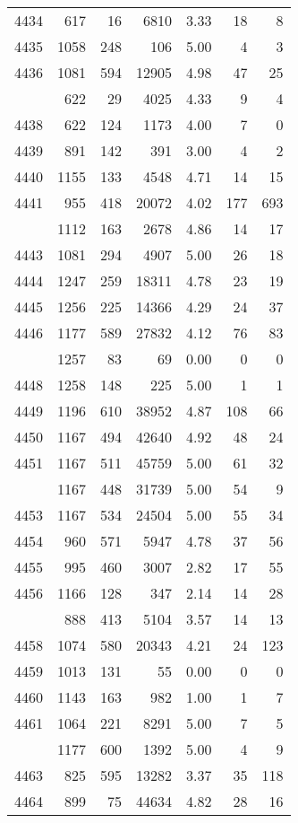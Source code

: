 \documentclass[
]{article}
\begin{document}
\begin{table}
\begin{tabular}[t]{lrrrrrr}
4434 & 617 & 16 & 6810 & 3.33 & 18 & 8\\
4435 & 1058 & 248 & 106 & 5.00 & 4 & 3\\
4436 & 1081 & 594 & 12905 & 4.98 & 47 & 25\\
\addlinespace
4437 & 622 & 29 & 4025 & 4.33 & 9 & 4\\
4438 & 622 & 124 & 1173 & 4.00 & 7 & 0\\
4439 & 891 & 142 & 391 & 3.00 & 4 & 2\\
4440 & 1155 & 133 & 4548 & 4.71 & 14 & 15\\
4441 & 955 & 418 & 20072 & 4.02 & 177 & 693\\
\addlinespace
4442 & 1112 & 163 & 2678 & 4.86 & 14 & 17\\
4443 & 1081 & 294 & 4907 & 5.00 & 26 & 18\\
4444 & 1247 & 259 & 18311 & 4.78 & 23 & 19\\
4445 & 1256 & 225 & 14366 & 4.29 & 24 & 37\\
4446 & 1177 & 589 & 27832 & 4.12 & 76 & 83\\
\addlinespace
4447 & 1257 & 83 & 69 & 0.00 & 0 & 0\\
4448 & 1258 & 148 & 225 & 5.00 & 1 & 1\\
4449 & 1196 & 610 & 38952 & 4.87 & 108 & 66\\
4450 & 1167 & 494 & 42640 & 4.92 & 48 & 24\\
4451 & 1167 & 511 & 45759 & 5.00 & 61 & 32\\
\addlinespace
4452 & 1167 & 448 & 31739 & 5.00 & 54 & 9\\
4453 & 1167 & 534 & 24504 & 5.00 & 55 & 34\\
4454 & 960 & 571 & 5947 & 4.78 & 37 & 56\\
4455 & 995 & 460 & 3007 & 2.82 & 17 & 55\\
4456 & 1166 & 128 & 347 & 2.14 & 14 & 28\\
\addlinespace
4457 & 888 & 413 & 5104 & 3.57 & 14 & 13\\
4458 & 1074 & 580 & 20343 & 4.21 & 24 & 123\\
4459 & 1013 & 131 & 55 & 0.00 & 0 & 0\\
4460 & 1143 & 163 & 982 & 1.00 & 1 & 7\\
4461 & 1064 & 221 & 8291 & 5.00 & 7 & 5\\
\addlinespace
4462 & 1177 & 600 & 1392 & 5.00 & 4 & 9\\
4463 & 825 & 595 & 13282 & 3.37 & 35 & 118\\
4464 & 899 & 75 & 44634 & 4.82 & 28 & 16\\

\end{tabular}
\end{table}
\end{document}
